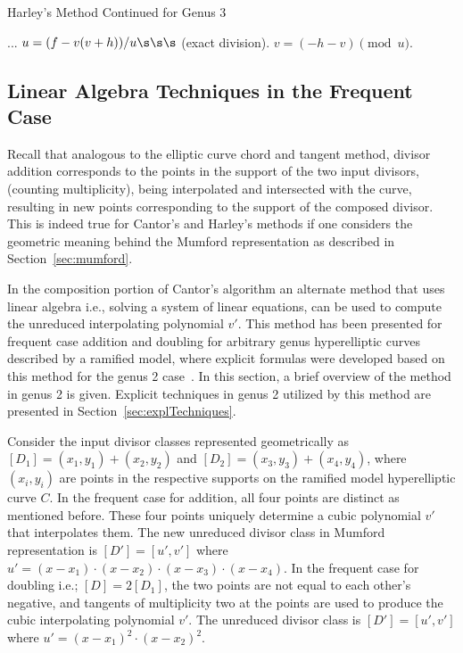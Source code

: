 \begin{center}
  \begin{minipage}{0.60\textwidth}
  \begin{algorithm}[H]
      \caption{Harley's Method Continued for Genus 3}
      \label{alg:harleyg3}
      \centering
      \begin{algorithmic}[1]
          \vspace{5pt}
          \Statex ...
          \State $u = (f - v(v + h))/u \s\s\s$ (exact division). 
          \State $v = (-h - v)\pmod{u}$.
          \vspace{1pt}
      \end{algorithmic}
  \end{algorithm}
  \end{minipage}
\end{center}

\subsection{Linear Algebra Techniques in the Frequent Case} \label{sec:geometric} 
Recall that analogous to the elliptic curve chord and tangent method, divisor
addition corresponds to the points in the support of the two input divisors,
(counting multiplicity), being interpolated and intersected with the curve,
resulting in new points corresponding to the support of the composed divisor.
This is indeed true for Cantor's and Harley's methods if one considers the
geometric meaning behind the Mumford representation as described in
Section~\ref{sec:mumford}. 

In the composition portion of Cantor's algorithm an alternate method that uses
linear algebra i.e., solving a system of linear equations, can be used to
compute the unreduced interpolating polynomial $v'$. This method has been
presented for frequent case addition and doubling for arbitrary genus
hyperelliptic curves described by a ramified model, where explicit formulas
were developed based on this method for the genus 2
case~\cite{CostelloLauter_geo_2011}.  In this section, a brief overview of the
method in genus 2 is given. Explicit techniques in genus 2 utilized by this
method are presented in Section~\ref{sec:explTechniques}.

Consider the input divisor classes represented geometrically as $[D_1] = (x_1,
y_1) + (x_2, y_2)$ and $[D_2] = (x_3, y_3) + (x_4, y_4)$, where $(x_i, y_i)$ are
points in the respective supports on the ramified model
hyperelliptic curve $C$. In the frequent case for addition, all four points are
distinct as mentioned before. These four points uniquely determine a cubic
polynomial $v'$ that interpolates them. The new unreduced divisor class in
Mumford representation is $[D'] = [u',v']$ where $u' = (x-x_1) \cdot (x-x_2)
\cdot (x-x_3) \cdot (x-x_4)$. In the frequent case for doubling i.e.; $[D]=
2[D_1]$, the two points are not equal to each other's negative, and tangents of
multiplicity two at the points are used to produce the cubic interpolating
polynomial $v'$. The unreduced divisor class is $[D'] = [u',v']$ where $ u' =
(x-x_1)^2 \cdot (x-x_2)^2$. 

